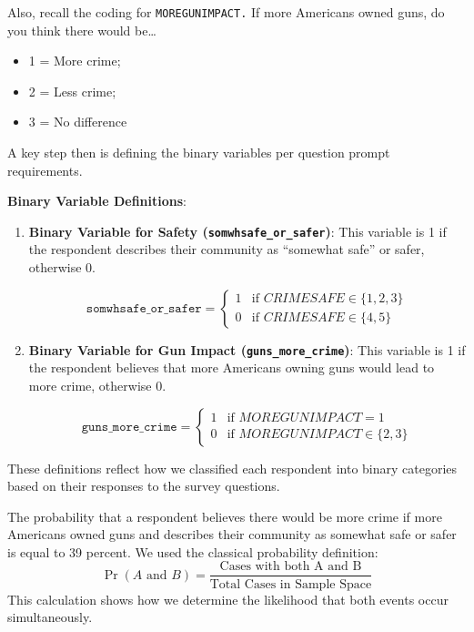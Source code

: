 \documentclass[
  11pt,
]{article}
\providecommand{\tightlist}{%
  \setlength{\itemsep}{0pt}\setlength{\parskip}{0pt}}
\begin{document}
Also, recall the coding for \texttt{MOREGUNIMPACT.} If more Americans
owned guns, do you think there would be\ldots{}

\begin{itemize}
\tightlist
\item
  1 = More crime;
\item
  2 = Less crime;
\item
  3 = No difference
\end{itemize}

A key step then is defining the binary variables per question prompt
requirements.

\textbf{Binary Variable Definitions}:

\begin{enumerate}
\def\labelenumi{\arabic{enumi}.}
\item
  \textbf{Binary Variable for Safety (\texttt{somwhsafe\_or\_safer})}:
  This variable is 1 if the respondent describes their community as
  ``somewhat safe'' or safer, otherwise 0.

  \[
  \texttt{somwhsafe\_or\_safer} =
  \begin{cases}
     1 & \text{if } CRIMESAFE \in \{1, 2, 3\} \\
     0 & \text{if } CRIMESAFE \in \{4, 5\}
  \end{cases}
  \]
\item
  \textbf{Binary Variable for Gun Impact (\texttt{guns\_more\_crime})}:
  This variable is 1 if the respondent believes that more Americans
  owning guns would lead to more crime, otherwise 0.

  \[
  \texttt{guns\_more\_crime} =
  \begin{cases}
     1 & \text{if } MOREGUNIMPACT = 1 \\
     0 & \text{if } MOREGUNIMPACT \in \{2, 3\}
  \end{cases}
  \]
\end{enumerate}

These definitions reflect how we classified each respondent into binary
categories based on their responses to the survey questions.

The probability that a respondent believes there would be more crime if
more Americans owned guns and describes their community as somewhat safe
or safer is equal to 39 percent. We used the classical probability
definition:
\[\Pr(A\text{ and }B) = \frac{\text{Cases with both A and B}}{\text{Total Cases in Sample Space}}\]
This calculation shows how we determine the likelihood that both events
occur simultaneously.
\end{document}

